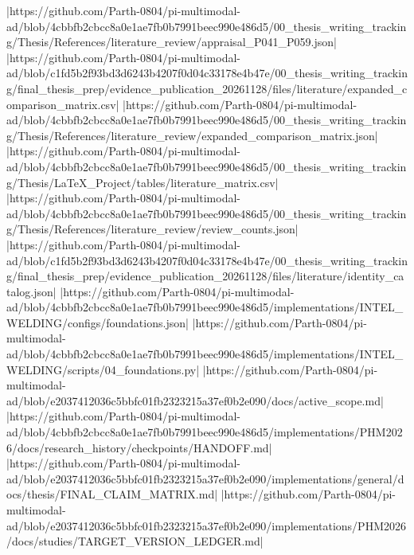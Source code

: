 |https://github.com/Parth-0804/pi-multimodal-ad/blob/4cbbfb2cbcc8a0e1ae7fb0b7991beec990e486d5/00_thesis_writing_tracking/Thesis/References/literature_review/appraisal_P041_P059.json|
|https://github.com/Parth-0804/pi-multimodal-ad/blob/c1fd5b2f93bd3d6243b4207f0d04c33178e4b47e/00_thesis_writing_tracking/final_thesis_prep/evidence_publication_20261128/files/literature/expanded_comparison_matrix.csv|
|https://github.com/Parth-0804/pi-multimodal-ad/blob/4cbbfb2cbcc8a0e1ae7fb0b7991beec990e486d5/00_thesis_writing_tracking/Thesis/References/literature_review/expanded_comparison_matrix.json|
|https://github.com/Parth-0804/pi-multimodal-ad/blob/4cbbfb2cbcc8a0e1ae7fb0b7991beec990e486d5/00_thesis_writing_tracking/Thesis/LaTeX_Project/tables/literature_matrix.csv|
|https://github.com/Parth-0804/pi-multimodal-ad/blob/4cbbfb2cbcc8a0e1ae7fb0b7991beec990e486d5/00_thesis_writing_tracking/Thesis/References/literature_review/review_counts.json|
|https://github.com/Parth-0804/pi-multimodal-ad/blob/c1fd5b2f93bd3d6243b4207f0d04c33178e4b47e/00_thesis_writing_tracking/final_thesis_prep/evidence_publication_20261128/files/literature/identity_catalog.json|
|https://github.com/Parth-0804/pi-multimodal-ad/blob/4cbbfb2cbcc8a0e1ae7fb0b7991beec990e486d5/implementations/INTEL_WELDING/configs/foundations.json|
|https://github.com/Parth-0804/pi-multimodal-ad/blob/4cbbfb2cbcc8a0e1ae7fb0b7991beec990e486d5/implementations/INTEL_WELDING/scripts/04_foundations.py|
|https://github.com/Parth-0804/pi-multimodal-ad/blob/e2037412036c5bbfc01fb2323215a37ef0b2e090/docs/active_scope.md|
|https://github.com/Parth-0804/pi-multimodal-ad/blob/4cbbfb2cbcc8a0e1ae7fb0b7991beec990e486d5/implementations/PHM2026/docs/research_history/checkpoints/HANDOFF.md|
|https://github.com/Parth-0804/pi-multimodal-ad/blob/e2037412036c5bbfc01fb2323215a37ef0b2e090/implementations/general/docs/thesis/FINAL_CLAIM_MATRIX.md|
|https://github.com/Parth-0804/pi-multimodal-ad/blob/e2037412036c5bbfc01fb2323215a37ef0b2e090/implementations/PHM2026/docs/studies/TARGET_VERSION_LEDGER.md|
